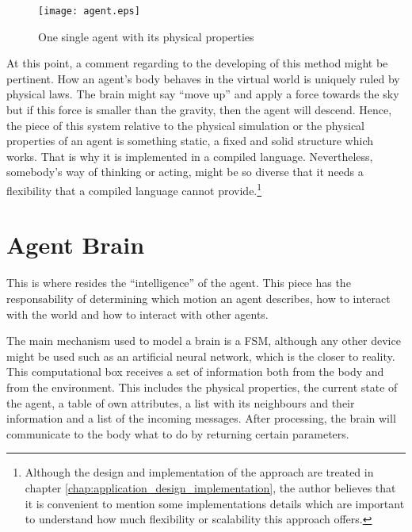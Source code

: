 \begin{figure}[!htb]
  \centering
  \texttt{[image: agent.eps]}
  \caption{One single agent with its physical properties}
  \label{fig:navigation}
\end{figure}

At this point, a comment regarding to the developing of this method might be pertinent. How an agent's body behaves in the virtual world is uniquely ruled by physical laws. The brain might say ``move up'' and apply a force towards the sky but if this force is smaller than the gravity, then the agent will descend. Hence, the piece of this system relative to the physical simulation or the physical properties of an agent is something static, a fixed and solid structure which works. That is why it is implemented in a compiled language. Nevertheless, somebody's way of thinking or acting, might be so diverse that it needs a flexibility that a compiled language cannot provide.\footnote{Although the design and implementation of the approach are treated in chapter \ref{chap:application_design_implementation}, the author believes that it is convenient to mention some implementations details which are important to understand how much flexibility or scalability this approach offers.}

\section{Agent Brain}
This is where resides the ``intelligence'' of the agent. This piece has the responsability of determining which motion an agent describes, how to interact with the world and how to interact with other agents.

The main mechanism used to model a brain is a FSM, although any other device might be used such as an artificial neural network, which is the closer to reality. This computational box receives a set of information both from the body and from the environment. This includes the physical properties, the current state of the agent, a table of own attributes, a list with its neighbours and their information and a list of the incoming messages. After processing, the brain will communicate to the body what to do by returning certain parameters.


